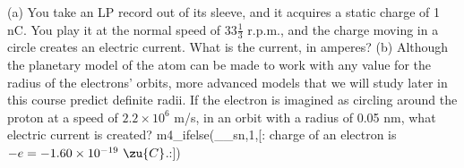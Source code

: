 (a) You take an LP record out of its sleeve, and it
        acquires a static charge of 1 nC.  You play it at the normal
        speed of $33\frac{1}{3}$ r.p.m., and the charge moving in a circle
        creates an electric current.  What is the current, in amperes?
        \answercheck\hwendpart
        (b) Although the planetary model of the atom can be made to
        work with any value for the radius of the electrons' orbits,
        more advanced models that we will study later in this course
        predict definite radii. If the electron is imagined as
        circling around the proton at a speed of $2.2\times10^6$ 
        m/s, in an orbit with a radius of 0.05 nm, what electric current is created?
m4_ifelse(__sn,1,[:%
charge of an electron is $-e=-1.60\times10^{-19}\ \zu{C}$.:])
        \answercheck
